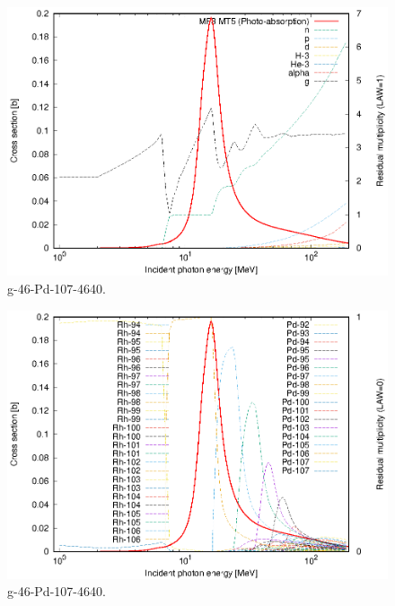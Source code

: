 \begin{figure}
 \includegraphics[width=\linewidth]{eps/g_46-Pd-107_4640.eps}
  \caption{g-46-Pd-107-4640.}
\end{figure}
\begin{figure}
 \includegraphics[width=\linewidth]{eps-law0/g_46-Pd-107_4640.eps}
 \caption{g-46-Pd-107-4640.}
\end{figure}
\newpage \clearpage

